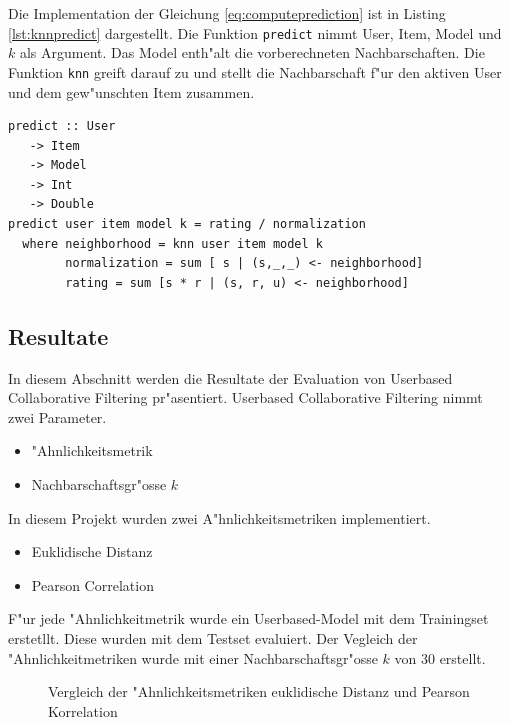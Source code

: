 \documentclass[a4paper, 12pt]{article}
\begin{document}
Die Implementation der Gleichung \ref{eq:computeprediction} ist in Listing \ref{lst:knnpredict} dargestellt. Die Funktion \verb|predict| nimmt User, Item, Model und $k$ als Argument. Das Model enth"alt die vorberechneten Nachbarschaften. Die Funktion \verb|knn| greift darauf zu und stellt die Nachbarschaft f"ur den aktiven User und dem gew"unschten Item zusammen.

\begin{lstlisting}[caption=Berechnung von $p_{u,i}$, label=lst:knnpredict]
  predict :: User
   -> Item
   -> Model
   -> Int
   -> Double
predict user item model k = rating / normalization
  where neighborhood = knn user item model k
        normalization = sum [ s | (s,_,_) <- neighborhood]
        rating = sum [s * r | (s, r, u) <- neighborhood]
\end{lstlisting}

\subsection{Resultate}
\label{sec:userbasedresults}

In diesem Abschnitt werden die Resultate der Evaluation von Userbased Collaborative Filtering pr"asentiert. Userbased Collaborative Filtering nimmt zwei Parameter.
\begin{itemize}
\item "Ahnlichkeitsmetrik
\item Nachbarschaftsgr"osse $k$
\end{itemize}

In diesem Projekt wurden zwei A"hnlichkeitsmetriken implementiert.

\begin{itemize}
\item Euklidische Distanz
\item Pearson Correlation
\end{itemize}

F"ur jede "Ahnlichkeitmetrik wurde ein Userbased-Model mit dem Trainingset erstetllt. Diese wurden mit dem Testset evaluiert. Der Vegleich der "Ahnlichkeitmetriken wurde mit einer Nachbarschaftsgr"osse $k$ von 30 erstellt.

\begin{figure}
  \centering
{}
\label{fig:similarity}
\caption{Vergleich der "Ahnlichkeitsmetriken euklidische Distanz und Pearson Korrelation}
\end{figure}
\end{document}
